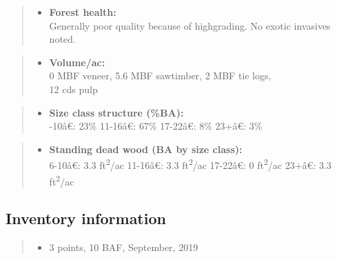 \documentclass[]{tufte-handout}
\newcommand{\euro}{€}
\providecommand{\tightlist}{%
  \setlength{\itemsep}{0pt}\setlength{\parskip}{0pt}}
\begin{document}
\begin{quote}
\begin{itemize}
\tightlist
\item
  \textbf{Forest health:}\\
  \vspace{2pt} Generally poor quality because of highgrading. No exotic
  invasives noted.
\end{itemize}
\end{quote}

\begin{quote}
\begin{itemize}
\tightlist
\item
  \textbf{Volume/ac:}\\
  \vspace{2pt} 0 MBF veneer, 5.6 MBF sawtimber, 2 MBF tie logs,\\
  12 cds pulp
\end{itemize}
\end{quote}

\begin{quote}
\begin{itemize}
\tightlist
\item
  \textbf{Size class structure (\%BA):}\\
  \vspace{2pt} -10â\euro{}: 23\% \textbar{} 11-16â\euro{}:
  67\% \textbar{} 17-22â\euro{}: 8\% \textbar{} 23+â\euro{}: 3\%
\end{itemize}
\end{quote}

\begin{quote}
\begin{itemize}
\tightlist
\item
  \textbf{Standing dead wood (BA by size class):}\\
  \vspace{2pt} 6-10â\euro{}: 3.3 ft\textsuperscript{2}/ac \textbar{}
  11-16â\euro{}: 3.3 ft\textsuperscript{2}/ac \textbar{}
  17-22â\euro{}: 0 ft\textsuperscript{2}/ac \textbar{} 23+â\euro{}:
  3.3 ft\textsuperscript{2}/ac
\end{itemize}
\end{quote}

\subsection{Inventory information}\label{inventory-information-2}

\begin{quote}
\begin{itemize}
\tightlist
\item
  3 points, 10 BAF, September, 2019
\end{itemize}
\end{quote}
\end{document}
